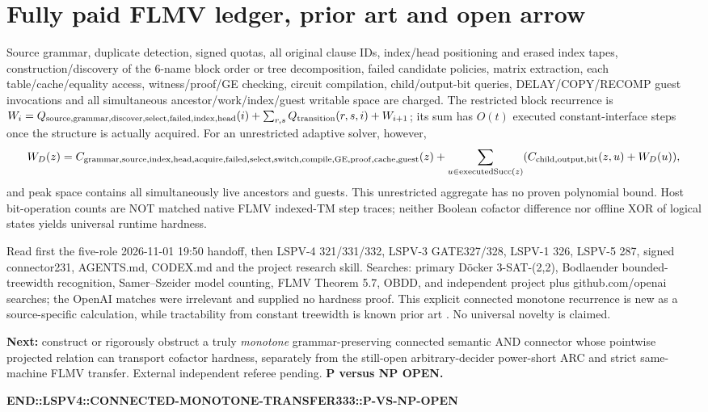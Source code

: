 \documentclass[11pt]{article}
\begin{document}
\section{Fully paid FLMV ledger, prior art and open arrow}
Source grammar, duplicate detection, signed quotas, all original clause IDs, index/head positioning and erased index tapes, construction/discovery of the 6-name block order or tree decomposition, failed candidate policies, matrix extraction, each table/cache/equality access, witness/proof/GE checking, circuit compilation, child/output-bit queries, DELAY/COPY/RECOMP guest invocations and all simultaneous ancestor/work/index/guest writable space are charged. The restricted block recurrence is $W_i=Q_{\rm source,grammar,discover,select,failed,index,head}(i)+\sum_{r,s}Q_{\rm transition}(r,s,i)+W_{i+1}$; its sum has $O(t)$ executed constant-interface steps once the structure is actually acquired. For an unrestricted adaptive solver, however,
\[
W_D(z)=C_{\rm grammar,source,index,head,acquire,failed,select,switch,compile,GE,proof,cache,guest}(z)+
\sum_{u\in{\rm executedSucc}(z)}(C_{\rm child,output,bit}(z,u)+W_D(u)),
\]
and peak space contains all simultaneously live ancestors and guests. This unrestricted aggregate has no proven polynomial bound. Host bit-operation counts are NOT matched native FLMV indexed-TM step traces; neither Boolean cofactor difference nor offline XOR of logical states yields universal runtime hardness.

Read first the five-role 2026-11-01 19:50 handoff, then LSPV-4 321/331/332, LSPV-3 GATE327/328, LSPV-1 326, LSPV-5 287, signed connector231, AGENTS.md, CODEX.md and the project research skill. Searches: primary D\"ocker 3-SAT-(2,2), Bodlaender bounded-treewidth recognition, Samer--Szeider model counting, FLMV Theorem 5.7, OBDD, and independent project plus github.com/openai searches; the OpenAI matches were irrelevant and supplied no hardness proof. This explicit connected monotone recurrence is new as a source-specific calculation, while tractability from constant treewidth is known prior art \cite{docker2019,bodlaender1996,samerszeider2010,razgon2013,flmv2005}. No universal novelty is claimed.

\noindent\textbf{Next:} construct or rigorously obstruct a truly \emph{monotone} grammar-preserving connected semantic AND connector whose pointwise projected relation can transport cofactor hardness, separately from the still-open arbitrary-decider power-short ARC and strict same-machine FLMV transfer. External independent referee pending. \textbf{P versus NP OPEN.}


\noindent\textbf{END::LSPV4::CONNECTED-MONOTONE-TRANSFER333::P-VS-NP-OPEN}
\end{document}
